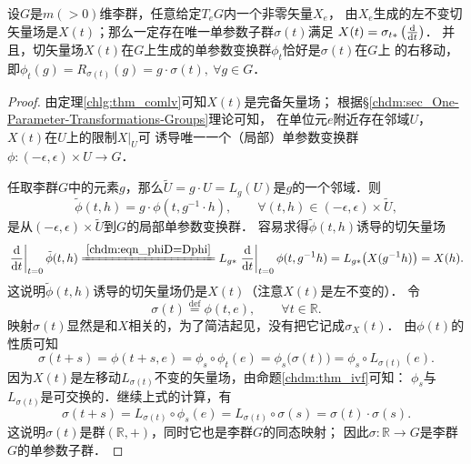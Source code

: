 

\begin{theorem}\label{chlg:thm_oglsv}
    设$G$是$m(>0)$维李群，任意给定$T_e G$内一个非零矢量$X_e$，
    由$X_e$生成的左不变切矢量场是$X(t)$；那么一定存在唯一单参数子群$\sigma(t)$满足
     $X(t)=\sigma_{t*}\left(\frac{{\rm d}}{{\rm d}t}\right)$．
    并且，切矢量场$X(t)$在$G$上生成的单参数变换群$\phi_t$恰好是$\sigma(t)$在$G$上
    的右移动，即$\phi_t(g)=R_{\sigma(t)}(g)=g\cdot \sigma(t),\ \forall g\in G$．
\end{theorem}
\begin{proof}
    由定理\ref{chlg:thm_comlv}可知$X(t)$是完备矢量场；
根据\S\ref{chdm:sec_One-Parameter-Transformations-Groups}理论可知，
在单位元$e$附近存在邻域$U$，$X(t)$在$U$上的限制$X|_U$可
诱导唯一一个（局部）单参数变换群$\phi:(-\epsilon,\epsilon)\times U\to G$．

任取李群$G$中的元素$g$，那么$\tilde{U}=g\cdot U=L_g(U)$是$g$的一个邻域．则
\begin{equation}
    \tilde{\phi}(t,h)=g\cdot \phi(t,g^{-1}\cdot h),\qquad
    \forall (t,h)\in (-\epsilon,\epsilon)\times \tilde{U},
\end{equation}
是从$(-\epsilon,\epsilon)\times \tilde{U}$到$G$的局部单参数变换群．
容易求得$\tilde{\phi}(t,h)$诱导的切矢量场
\begin{equation}
    \left. \frac{{\rm d}}{{\rm d}t}\right|_{t=0}\tilde{\phi}(t,h)
    \xlongequal{\ref{chdm:eqn_phiD=Dphi}}
    L_{g*}\left. \frac{{\rm d}}{{\rm d}t}\right|_{t=0} \phi(t,g^{-1}h)
    =L_{g*} \bigl(X(g^{-1}h)\bigr) = X(h).
\end{equation}
这说明$\tilde{\phi}(t,h)$诱导的切矢量场仍是$X(t)$（注意$X(t)$是左不变的）．
令
\begin{equation}\label{chlg:eqn_opsi}
    \sigma(t) \overset{\mathrm {def}}{=} \phi(t,e),\qquad \forall t\in \mathbb{R}.
\end{equation}
映射$\sigma(t)$显然是和$X$相关的，为了简洁起见，没有把它记成$\sigma_X(t)$．
由$\phi(t)$的性质可知
\begin{equation}
    \sigma(t+s)=\phi(t+s,e)=\phi_s \circ \phi_t(e) = \phi_s\bigl(\sigma(t)\bigr)
    = \phi_s\circ L_{\sigma(t)}(e) .
\end{equation}
因为$X(t)$是左移动$L_{\sigma(t)}$不变的矢量场，由命题\ref{chdm:thm_ivf}可知：
$\phi_s$与$L_{\sigma(t)}$是可交换的．继续上式的计算，有
\begin{equation}
    \sigma(t+s)=L_{\sigma(t)} \circ  \phi_s (e) =L_{\sigma(t)} \circ \sigma(s)
    =\sigma(t) \cdot \sigma(s) .
\end{equation}
这说明$\sigma(t)$是群$(\mathbb{R},+)$，同时它也是李群$G$的同态映射；
因此$\sigma:\mathbb{R}\to G$是李群$G$的单参数子群．


\end{proof}
